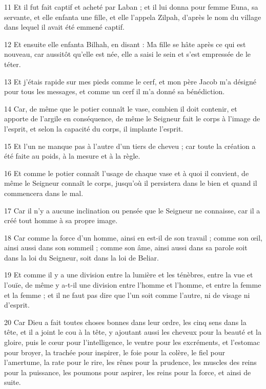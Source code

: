 \par 11 Et il fut fait captif et acheté par Laban ; et il lui donna pour femme Euna, sa servante, et elle enfanta une fille, et elle l'appela Zilpah, d'après le nom du village dans lequel il avait été emmené captif.

\par 12 Et ensuite elle enfanta Bilhah, en disant : Ma fille se hâte après ce qui est nouveau, car aussitôt qu'elle est née, elle a saisi le sein et s'est empressée de le téter.

\par 13 Et j'étais rapide sur mes pieds comme le cerf, et mon père Jacob m'a désigné pour tous les messages, et comme un cerf il m'a donné sa bénédiction.

\par 14 Car, de même que le potier connaît le vase, combien il doit contenir, et apporte de l'argile en conséquence, de même le Seigneur fait le corps à l'image de l'esprit, et selon la capacité du corps, il implante l'esprit.

\par 15 Et l'un ne manque pas à l'autre d'un tiers de cheveu ; car toute la création a été faite au poids, à la mesure et à la règle.

\par 16 Et comme le potier connaît l'usage de chaque vase et à quoi il convient, de même le Seigneur connaît le corps, jusqu'où il persistera dans le bien et quand il commencera dans le mal.

\par 17 Car il n'y a aucune inclination ou pensée que le Seigneur ne connaisse, car il a créé tout homme à sa propre image.

\par 18 Car comme la force d'un homme, ainsi en est-il de son travail ; comme son œil, ainsi aussi dans son sommeil ; comme son âme, ainsi aussi dans sa parole soit dans la loi du Seigneur, soit dans la loi de Beliar.

\par 19 Et comme il y a une division entre la lumière et les ténèbres, entre la vue et l'ouïe, de même y a-t-il une division entre l'homme et l'homme, et entre la femme et la femme ; et il ne faut pas dire que l’un soit comme l’autre, ni de visage ni d’esprit.

\par 20 Car Dieu a fait toutes choses bonnes dans leur ordre, les cinq sens dans la tête, et il a joint le cou à la tête, y ajoutant aussi les cheveux pour la beauté et la gloire, puis le cœur pour l'intelligence, le ventre pour les excréments, et l'estomac pour broyer, la trachée pour inspirer, le foie pour la colère, le fiel pour l'amertume, la rate pour le rire, les rênes pour la prudence, les muscles des reins pour la puissance, les poumons pour aspirer, les reins pour la force, et ainsi de suite.

